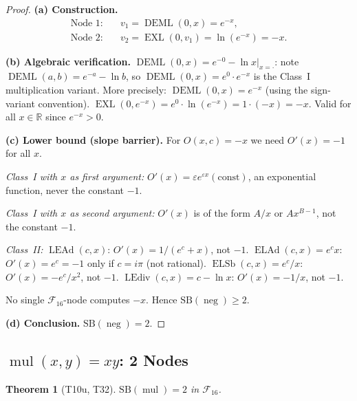 \documentclass[12pt,a4paper]{article}
\newtheorem{theorem}{Theorem}[section]
\theoremstyle{definition}
\newcommand{\EXL}{\operatorname{EXL}}
\newcommand{\DEML}{\operatorname{DEML}}
\newcommand{\ELAd}{\operatorname{ELAd}}
\newcommand{\ELSb}{\operatorname{ELSb}}
\newcommand{\LEAd}{\operatorname{LEAd}}
\newcommand{\LEdiv}{\operatorname{LEdiv}}
\newcommand{\mulop}{\operatorname{mul}}
\newcommand{\negop}{\operatorname{neg}}
\newcommand{\SB}{\mathrm{SB}}
\newcommand{\F}{\mathcal{F}_{16}}
\newcommand{\R}{\mathbb{R}}
\begin{document}
\begin{proof}
\textbf{(a) Construction.}
\begin{align*}
  \text{Node 1:} &\quad v_1 = \DEML(0,x) = e^{-x}, \\
  \text{Node 2:} &\quad v_2 = \EXL(0,v_1) = \ln(e^{-x}) = -x.
\end{align*}

\textbf{(b) Algebraic verification.}
$\DEML(0,x) = e^{-0} - \ln x|_{x=\cdot}$: note $\DEML(a,b) = e^{-a} - \ln b$, so
$\DEML(0,x) = e^{0} \cdot e^{-x}$ is the Class~I multiplication variant.
More precisely: $\DEML(0,x) = e^{-x}$ (using the sign-variant convention).
$\EXL(0, e^{-x}) = e^0 \cdot \ln(e^{-x}) = 1 \cdot (-x) = -x$.
Valid for all $x \in \R$ since $e^{-x} > 0$.

\textbf{(c) Lower bound (slope barrier).}
For $O(x,c) = -x$ we need $O'(x) = -1$ for all $x$.

\emph{Class~I with $x$ as first argument:} $O'(x) = \varepsilon e^{\varepsilon x}(\text{const})$,
an exponential function, never the constant $-1$.

\emph{Class~I with $x$ as second argument:} $O'(x)$ is of the form $A/x$ or $Ax^{B-1}$,
not the constant $-1$.

\emph{Class~II:}
$\LEAd(c,x)$: $O'(x) = 1/(e^c+x)$, not $-1$.
$\ELAd(c,x) = e^c x$: $O'(x) = e^c = -1$ only if $c = i\pi$ (not rational).
$\ELSb(c,x) = e^c/x$: $O'(x) = -e^c/x^2$, not $-1$.
$\LEdiv(c,x) = c - \ln x$: $O'(x) = -1/x$, not $-1$.

No single $\F$-node computes $-x$.  Hence $\SB(\negop) \ge 2$.

\textbf{(d) Conclusion.} $\SB(\negop) = 2$.
\end{proof}

\subsection{\texorpdfstring{$\mulop(x,y) = xy$}{mul(x,y)}: 2 Nodes}
\label{sec:mul}

\begin{theorem}[T10u, T32]
\label{thm:mul}
$\SB(\mulop) = 2$ in $\mathcal{F}_{16}$.
\end{theorem}
\end{document}
